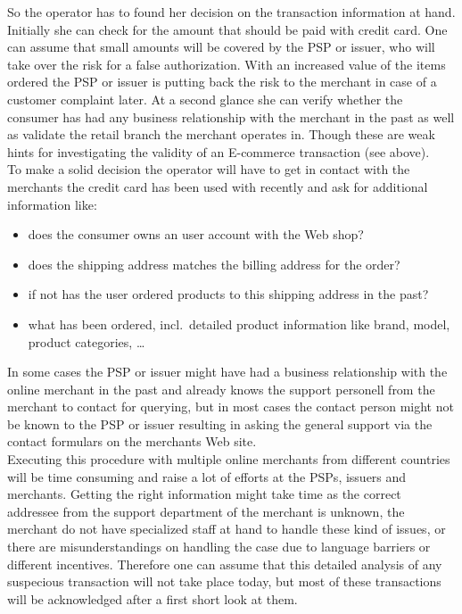 So the operator has to found her decision on the transaction information at hand. Initially she can check for the amount that should be paid with credit card. One can assume that small amounts will be covered by the \gls{PSP} or issuer, who will take over the risk for a false authorization. With an increased value of the items ordered the \gls{PSP} or issuer is putting back the risk to the merchant in case of a customer complaint later. At a second glance she can verify whether the consumer has had any business relationship with the merchant in the past as well as validate the retail branch the merchant operates in. Though these are weak hints for investigating the validity of an E-commerce transaction (see above). \\

To make a solid decision the operator will have to get in contact with the merchants the credit card has been used with recently and ask for additional information like:\@

\begin{itemize}
  \item does the consumer owns an user account with the Web shop?
  \item does the shipping address matches the billing address for the order?
  \item if not has the user ordered products to this shipping address in the past?
  \item what has been ordered, incl.\ detailed product information like brand, model, product categories, \ldots
\end{itemize}

In some cases the \gls{PSP} or issuer might have had a business relationship with the online merchant in the past and already knows the support personell from the merchant to contact for querying, but in most cases the contact person might not be known to the \gls{PSP} or issuer resulting in asking the general support via the contact formulars on the merchants Web site. \\

Executing this procedure with multiple online merchants from different countries will be time consuming and raise a lot of efforts at the \gls{PSP}s, issuers and merchants. Getting the right information might take time as the correct addressee from the support department of the merchant is unknown, the merchant do not have specialized staff at hand to handle these kind of issues, or there are misunderstandings on handling the case due to language barriers or different incentives. Therefore one can assume that this detailed analysis of any suspecious transaction will not take place today, but most of these transactions will be acknowledged after a first short look at them. \\

